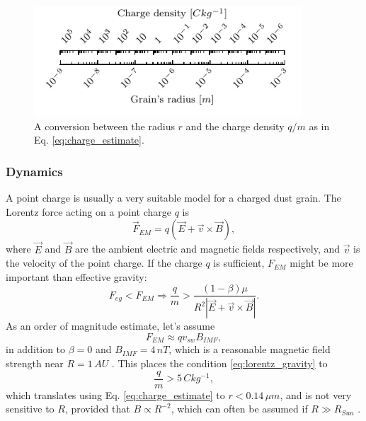 \begin{figure}[h]
 	\centering
 	\includegraphics[width=10cm]{figures/charge_density_ruler.pdf}
 	\caption{A conversion between the radius $r$ and the charge density $q/m$ as in Eq. \ref{eq:charge_estimate}.}
 	\label{fig:charge_density_ruler}
\end{figure}

\subsubsection{Dynamics}

A point charge is usually a very suitable model for a charged dust grain. The Lorentz force acting on a point charge $q$ is
\begin{equation}
\vec{F}_{EM} = q \left( \vec{E} + \vec{v} \times \vec{B} \right),
\end{equation}
where $\vec{E}$ and $\vec{B}$ are the ambient electric and magnetic fields respectively, and $\vec{v}$ is the velocity of the point charge. If the charge $q$ is sufficient, $F_{EM}$ might be more important than effective gravity:
\begin{equation}
    F_{eg} < F_{EM} \Rightarrow \frac{q}{m} > \frac{(1-\beta)\mu}{R^2 \left| \vec{E} + \vec{v} \times \vec{B} \right|}. \label{eq:lorentz_gravity}
\end{equation}
As an order of magnitude estimate, let's assume 
\begin{equation}
    F_{EM} \approx q v_{sw} B_{IMF},
    \label{eq:EM_estimate}
\end{equation}
in addition to $\beta = 0$ and $B_{IMF} = 4 \, \si{nT}$, which is a reasonable magnetic field strength near $R = 1 \, \si{AU}$ \citep{mann2007nanoparticles}. This places the condition \ref{eq:lorentz_gravity} to
\begin{equation}
    \frac{q}{m} > 5 \, \si{C kg^{-1}},
\end{equation}
which translates using Eq. \ref{eq:charge_estimate} to $r < 0.14 \, \si{\mu m}$, and is not very sensitive to $R$, provided that $B \propto R^{-2}$, which can often be assumed if $R \gg R_{Sun}$ \citep{parker1958dynamics}.  

